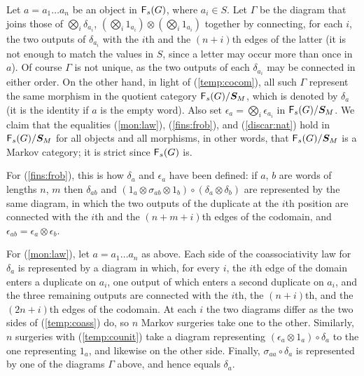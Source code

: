 \documentclass[12pt]{amsart}
\theoremstyle{plain}
\theoremstyle{definition}
\theoremstyle{remark}
\numberwithin{equation}{section}
\theoremstyle{plain}
\newcommand{\0}{\emptyset}
\newcommand{\cat}[1]{\textup{\textsf{#1}}}
\begin{document}
Let $a = a_1 \ldots a_n$ be an object in $\cat F_s(G)$, where $a_i \in S$. Let $\Gamma$ be the diagram that joins those of $\bigotimes_i \delta_{a_i}$, $(\bigotimes_i 1_{a_i}) \otimes (\bigotimes_i 1_{a_i})$ together by connecting, for each $i$, the two outputs of $\delta_{a_i}$ with the $i$th and the $(n+i)$th edges of the latter (it is not enough to match the values in $S$, since a letter may occur more than once in $a$). Of course $\Gamma$ is not unique, as the two outputs of each $\delta_{a_i}$ may be connected in either order. On the other hand, in light of (\ref{temp:cocom}), all such $\Gamma$ represent the same  morphism in the quotient category $\cat F_s(G) / \bm S_M$, which is denoted by $\delta_a$ (it is the identity if $a$ is the empty word). Also set $\epsilon_a = \bigotimes_i \epsilon_{a_i}$ in $\cat F_s(G) / \bm S_M$. We claim that the equalities (\ref{mon:law}), (\ref{fins:frob}), and (\ref{discar:nat}) hold in $\cat F_s(G) / \bm S_M$ for all objects and all morphisms, in other words, that $\cat F_s(G) / \bm S_M$ is a Markov category; it is strict since $\cat F_s(G)$ is.

For (\ref{fins:frob}), this is how $\delta_a$ and $\epsilon_a$ have been defined: if $a$, $b$ are words of lengths $n$, $m$ then $\delta_{ab}$ and $(1_a \otimes \sigma_{ab} \otimes 1_b) \circ (\delta_a \otimes \delta_b)$ are represented by the same diagram, in which the two outputs of the duplicate at the $i$th position are connected with the $i$th and the $(n + m + i)$th edges of the codomain, and $\epsilon_{ab} = \epsilon_a \otimes \epsilon_b$.

For (\ref{mon:law}), let $a = a_1 \ldots a_n$ as above. Each side of the coassociativity law for $\delta_a$ is represented by a diagram in which, for every $i$, the $i$th edge of the domain enters a duplicate on $a_i$, one output of which enters a second duplicate on $a_i$, and the three remaining outputs are connected with the $i$th, the $(n + i)$th, and the $(2n + i)$th edges of the codomain. At each $i$ the two diagrams differ as the two sides of (\ref{temp:coass}) do, so $n$ Markov surgeries take one to the other. Similarly, $n$ surgeries with (\ref{temp:counit}) take a diagram representing $(\epsilon_a \otimes 1_a) \circ \delta_a$ to the one representing $1_a$, and likewise on the other side. Finally, $\sigma_{aa} \circ \delta_a$ is represented by one of the diagrams $\Gamma$ above, and hence equals $\delta_a$.
\end{document}
